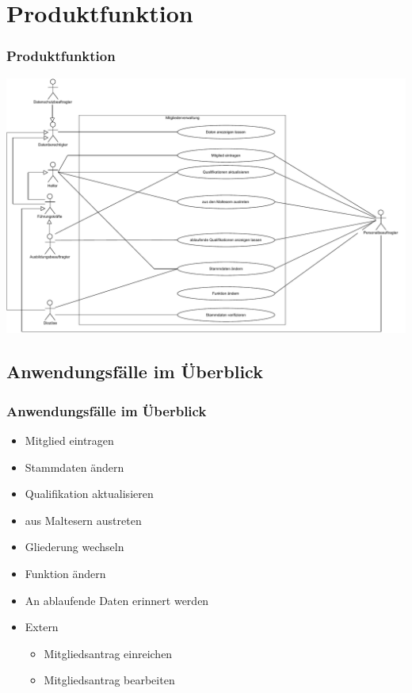 \documentclass{beamer}
\begin{document}
\section{Produktfunktion}		
\begin{frame}
\frametitle{Produktfunktion}
\includegraphics[height=0.75 \textheight]{PDF/Use_Case_Diagram/Use_Case.pdf}
\end{frame}


\subsection{Anwendungsfälle im Überblick}		
\begin{frame}
\frametitle{Anwendungsfälle im Überblick}
\begin{itemize}
	\item Mitglied eintragen
	\pause
	\item  Stammdaten ändern
	\pause
	\item  Qualifikation aktualisieren
	\pause
	\item  aus Maltesern austreten
	\pause
	\item  Gliederung wechseln
	\pause
	\item  Funktion ändern
	\pause
	\item  An ablaufende Daten erinnert werden
	\pause
	\item  Extern
	\begin{itemize}
		\item  Mitgliedsantrag einreichen
		\pause
		\item  Mitgliedsantrag bearbeiten
\end{itemize}
\end{itemize}
\end{frame}



\begin{frame}[title=Hauptgebaeude_Nacht.jpg]
\maketitle
\date{22. Mai 2018}
\end{frame}
\end{document}
